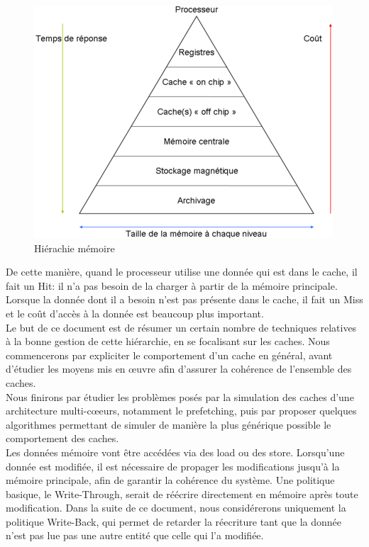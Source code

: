 \documentclass[a4paper]{article}
\begin{document}
\begin{figure}[!h]
\begin{center}
   \includegraphics[scale=0.75]{hierarchy.png}
   \caption{\label{hierarchy} Hiérachie mémoire}
\end{center}
\end{figure}

\indent De cette manière, quand le processeur utilise une donnée qui est dans le cache, il fait un Hit: il n'a pas besoin de la charger à partir de la mémoire principale. Lorsque la donnée dont il a besoin n'est pas présente dans le cache, il fait un Miss et le coût d'accès à la donnée est beaucoup plus important. \\

\indent Le but de ce document est de résumer un certain nombre de techniques relatives à la bonne gestion de cette hiérarchie, en se focalisant sur les caches. Nous commencerons par expliciter le comportement d'un cache en général, avant d'étudier les moyens mis en {\oe}uvre afin d'assurer la cohérence de l'ensemble des caches. \\

\indent Nous finirons par étudier les problèmes posés par la simulation des caches d'une architecture multi-c{\oe}eurs, notamment le prefetching, puis par proposer quelques algorithmes permettant de simuler de manière la plus générique possible le comportement des caches. \\


\indent Les données mémoire vont être accédées via des load ou des store. Lorsqu'une donnée est modifiée, il est nécessaire de propager les modifications jusqu'à la mémoire principale, afin de garantir la cohérence du système. Une politique basique, le Write-Through, serait de réécrire directement en mémoire après toute modification. Dans la suite de ce document, nous considérerons uniquement la politique Write-Back, qui permet de retarder la réecriture tant que la donnée n'est pas lue pas une autre entité que celle qui l'a modifiée.
\end{document}
